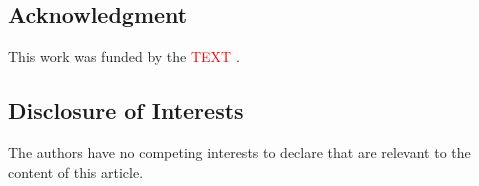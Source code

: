 \documentclass{article}
\begin{document}
\subsection*{Acknowledgment} 
This work was funded by the \textcolor{red}{TEXT} .

\subsection*{Disclosure of Interests} 
The authors have no competing interests to declare that are relevant to the content of this article. 




\end{document}

